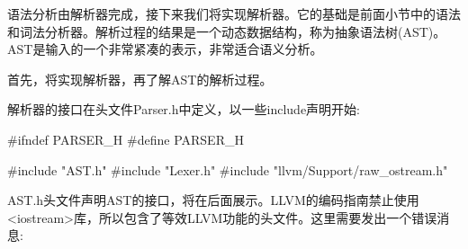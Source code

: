 语法分析由解析器完成，接下来我们将实现解析器。它的基础是前面小节中的语法和词法分析器。解析过程的结果是一个动态数据结构，称为抽象语法树(AST)。AST是输入的一个非常紧凑的表示，非常适合语义分析。

首先，将实现解析器，再了解AST的解析过程。


解析器的接口在头文件Parser.h中定义，以一些include声明开始:

\begin{cpp}
#ifndef PARSER_H
#define PARSER_H

#include "AST.h"
#include "Lexer.h"
#include "llvm/Support/raw_ostream.h"
\end{cpp}

AST.h头文件声明AST的接口，将在后面展示。LLVM的编码指南禁止使用<iostream>库，所以包含了等效LLVM功能的头文件。这里需要发出一个错误消息:


